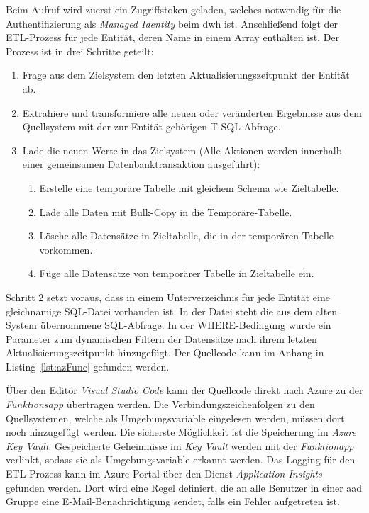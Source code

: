 Beim Aufruf wird zuerst ein Zugriffstoken geladen, welches notwendig für die Authentifizierung als \textit{Managed Identity} beim \ac{dwh} ist. Anschließend folgt der ETL-Prozess für jede Entität, deren Name in einem Array enthalten ist. Der Prozess ist in drei Schritte geteilt:
\begin{enumerate}
\item Frage aus dem Zielsystem den letzten Aktualisierungszeitpunkt der Entität ab.
\item Extrahiere und transformiere alle neuen oder veränderten Ergebnisse aus dem Quellsystem mit der zur Entität gehörigen T-SQL-Abfrage.
\item Lade die neuen Werte in das Zielsystem (Alle Aktionen werden innerhalb einer gemeinsamen Datenbanktransaktion ausgeführt):
    \begin{enumerate}
    \item Erstelle eine temporäre Tabelle mit gleichem Schema wie Zieltabelle.
    \item Lade alle Daten mit Bulk-Copy in die Temporäre-Tabelle.
    \item Lösche alle Datensätze in Zieltabelle, die in der temporären Tabelle vorkommen.
    \item Füge alle Datensätze von temporärer Tabelle in Zieltabelle ein.
    \end{enumerate}
\end{enumerate}
Schritt 2 setzt voraus, dass in einem Unterverzeichnis für jede Entität eine gleichnamige SQL-Datei vorhanden ist. In der Datei steht die aus dem alten System übernommene SQL-Abfrage. In der WHERE-Bedingung wurde ein Parameter zum dynamischen Filtern der Datensätze nach ihrem letzten Aktualisierungszeitpunkt hinzugefügt. Der Quellcode kann im Anhang in Listing~\ref{lst:azFunc} gefunden werden.

Über den Editor \textit{Visual Studio Code} kann der Quellcode direkt nach Azure zu der \textit{Funktionsapp} übertragen werden. Die Verbindungszeichenfolgen zu den Quellsystemen, welche als Umgebungsvariable eingelesen werden, müssen dort noch hinzugefügt werden. Die sicherste Möglichkeit ist die Speicherung im \textit{Azure Key Vault}. Gespeicherte Geheimnisse im \textit{Key Vault} werden mit der \textit{Funktionapp} verlinkt, sodass sie als Umgebungsvariable erkannt werden. Das Logging für den ETL-Prozess kann im Azure Portal über den Dienst \textit{Application Insights} gefunden werden. Dort wird eine Regel definiert, die an alle Benutzer in einer \ac{aad} Gruppe eine E-Mail-Benachrichtigung sendet, falls ein Fehler aufgetreten ist.

